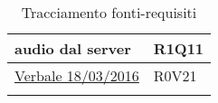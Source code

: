 \begin{center}
\begin{longtable}{| p{10.25cm} | p{2.5cm} | }
audio dal server } &  R1Q11  \\ \hline  \hyperref[sec:Verbale 18/03/2016]{ Verbale 18/03/2016  } &  R0V21  \\ \hline \caption{Tracciamento fonti-requisiti}
\end{longtable}
\egroup
\end{center}